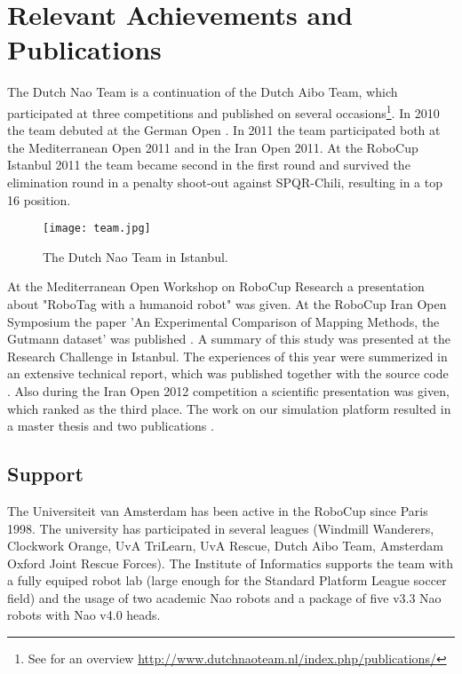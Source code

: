 \documentclass[11pt]{llncs}
\begin{document}
\section{Relevant Achievements and Publications}
The Dutch Nao Team is a continuation of the Dutch Aibo Team, which participated at three competitions and published on several occasions\footnote{See for an overview \url{http://www.dutchnaoteam.nl/index.php/publications/}}. 
In 2010 the team debuted at the German Open \cite{DutchNaoTeamTDP2010}. In 2011 the team participated both at the Mediterranean Open 2011 and in the Iran Open 2011.
 At the RoboCup Istanbul 2011 the team became second in the first round and survived the elimination round in a penalty shoot-out against SPQR-Chili, resulting in a top 16 position. 

\begin{figure}[!ht]
  \centering
  \texttt{[image: team.jpg]}
  \caption{The Dutch Nao Team in Istanbul.}
\label{fig:team}
\end{figure}

At the Mediterranean Open Workshop on RoboCup Research a presentation about "RoboTag with a humanoid robot" was given.
At the RoboCup Iran Open Symposium the paper 'An Experimental Comparison of Mapping Methods, the Gutmann dataset' was published \cite{Visser2011rios}. A summary of this study was presented at the Research Challenge in Istanbul.
The experiences of this year were summerized in an extensive technical report, which was published together with the source code \cite{DNT2011release}.
Also during the Iran Open 2012 competition a scientific presentation was given, which ranked as the third place. The work on our simulation platform resulted
in a master thesis \cite{vanNoort2012msc} and two publications \cite{vanNoort2012permis,vanNoort2012robocup}.

\subsection*{Support}
The Universiteit van Amsterdam has been active in the RoboCup since Paris 1998. The university has participated in several leagues (Windmill Wanderers, Clockwork Orange, UvA TriLearn, UvA Rescue, Dutch Aibo Team, Amsterdam Oxford Joint Rescue Forces).
The Institute of Informatics supports the team with a fully equiped robot lab (large enough for the Standard Platform League soccer field) and the usage of two academic Nao robots and a package of five v3.3 Nao robots with Nao v4.0 heads.
\end{document}
